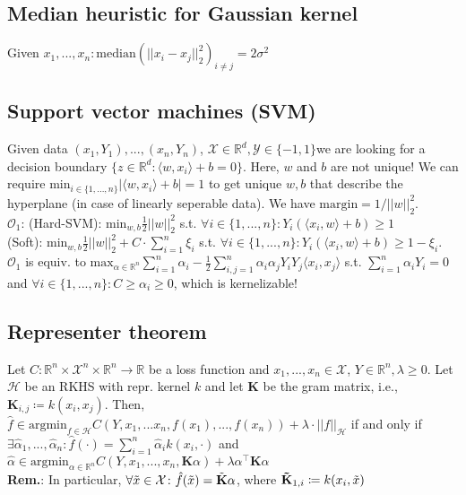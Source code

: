 \subsection*{Median heuristic for Gaussian kernel}
Given $x_1,...,x_n \colon \text{median}(||x_i-x_j||^2_2)_{i \neq j} = 2\sigma^2$

\subsection*{Support vector machines (SVM)}
Given data $(x_1,Y_1),...,(x_n, Y_n)$, $\mathcal{X} \in \mathbb{R}^d, \mathcal{Y} \in \{-1, 1\}$we are looking for a decision boundary $\{ z \in \mathbb{R}^d \colon \langle w, x_i\rangle + b = 0\}$. Here, $w$ and $b$ are not unique! We can require $\text{min}_{i\in\{1,...,n\}}|\langle w, x_i \rangle + b|=1$ to get unique $w, b$ that describe the hyperplane (in case of linearly seperable data). We have $\text{margin} = 1 / ||w||^2_2$.\\
$\mathcal{O}_1$: (Hard-SVM): $\text{min}_{w,b} \frac{1}{2}||w||^2_2$ s.t. $\forall i \in \{1,...,n\} \colon Y_i(\langle x_i, w \rangle + b) \geq 1$ \\
(Soft): $\text{min}_{w,b} \frac{1}{2}||w||^2_2 + C \cdot \sum_{i=1}^n \xi_i$ s.t. $\forall i \in \{1,...,n\} \colon Y_i(\langle x_i, w \rangle + b) \geq 1-\xi_i$.\\
$\mathcal{O}_1$ is equiv. to $\text{max}_{\alpha \in \mathbb{R}^n} \sum_{i=1}^n \alpha_i - \frac{1}{2}\sum_{i,j = 1}^n \alpha_i \alpha_j Y_i Y_j \langle x_i, x_j \rangle$ s.t. $\sum_{i=1}^n \alpha_iY_i = 0$ and $\forall i \in \{1,...,n\} \colon C \geq \alpha_i \geq 0$, which is kernelizable!
\subsection*{Representer theorem}
Let $C \colon \mathbb{R}^n \times \mathcal{X}^n \times \mathbb{R}^n \to \mathbb{R}$ be a loss function and $x_1,...,x_n \in \mathcal{X}$, $Y \in \mathbb{R}^n, \lambda \geq 0$. Let $\mathcal{H}$ be an RKHS with repr. kernel $k$ and let $\mathbf{K}$ be the gram matrix, i.e., $\mathbf{K}_{i,j} \coloneqq k(x_i, x_j)$. Then, \\
$\hat{f} \in \text{argmin}_{f\in \mathcal{H}} C(Y,x_1,...x_n,f(x_1),...,f(x_n)) + \lambda \cdot ||f||_\mathcal{H}$ if and only if \\
$\exists {\hat{\alpha}_1,...,\hat{\alpha}_n} \colon \hat{f}(\cdot) = \sum_{i=1}^n \hat{\alpha}_i k(x_i, \cdot)$ and \\
$\hat{\alpha} \in \text{argmin}_{\alpha \in \mathbb{R}^n} C(Y, x_1,...,x_n, \mathbf{K}\alpha) + \lambda\alpha^\intercal\mathbf{K}\alpha$ \\
\textbf{Rem.}: In particular, $\forall \Tilde{x} \in \mathcal{X} \colon \hat{f}(\Tilde{x}) = \Tilde{\mathbf{K}}\alpha$, where $\mathbf{\Tilde{K}}_{1,i} \coloneqq k(x_i, \Tilde{x})$